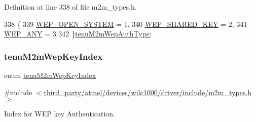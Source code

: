 Definition at line 338 of file m2m\+\_\+types.\+h.


\begin{DoxyCode}
338              \{
339     \hyperlink{group__WlanEnums_ggadb7d333125e6dcd9bf5e1c47f7d85c42a486491e09ad6e120b316d488dbeadc76}{WEP\_OPEN\_SYSTEM} = 1,
340     \hyperlink{group__WlanEnums_ggadb7d333125e6dcd9bf5e1c47f7d85c42a499409188630862aa172dc8afab93606}{WEP\_SHARED\_KEY}    = 2,
341     \hyperlink{group__WlanEnums_ggadb7d333125e6dcd9bf5e1c47f7d85c42a604c4b6344620950733514c797ce4800}{WEP\_ANY} = 3
342 \}\hyperlink{group__WlanEnums_gadb7d333125e6dcd9bf5e1c47f7d85c42}{tenuM2mWepAuthType};
\end{DoxyCode}
\mbox{\label{group__WlanEnums_ga43e100b0ae55a0b7000e5eaeaac24b8d}} 
\subsubsection{\texorpdfstring{tenu\+M2m\+Wep\+Key\+Index}{tenuM2mWepKeyIndex}}
{\footnotesize\ttfamily enum \hyperlink{group__WlanEnums_ga43e100b0ae55a0b7000e5eaeaac24b8d}{tenu\+M2m\+Wep\+Key\+Index}}



{\ttfamily \#include $<$\hyperlink{m2m__types_8h}{third\+\_\+party/atmel/devices/wilc1000/driver/include/m2m\+\_\+types.\+h}$>$}



Index for W\+EP key Authentication. 

